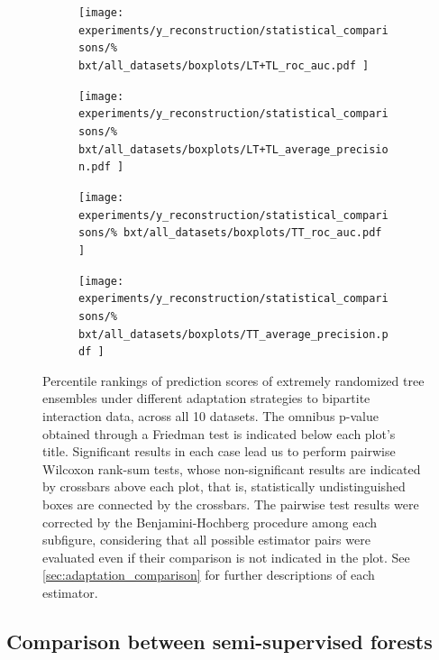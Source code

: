 \begin{figure}[tbh]
    \centering
    \begin{subfigure}{0.49\textwidth}
        \texttt{[image: 
            experiments/y\_reconstruction/statistical\_comparisons/\%
            bxt/all\_datasets/boxplots/LT+TL\_roc\_auc.pdf
        ]}
    \end{subfigure}
    \begin{subfigure}{0.49\textwidth}
        \texttt{[image: 
            experiments/y\_reconstruction/statistical\_comparisons/\%
            bxt/all\_datasets/boxplots/LT+TL\_average\_precision.pdf
        ]}
    \end{subfigure}

    \begin{subfigure}{0.49\textwidth}
        \texttt{[image: 
            experiments/y\_reconstruction/statistical\_comparisons/\%
            bxt/all\_datasets/boxplots/TT\_roc\_auc.pdf
        ]}
    \end{subfigure}
    \begin{subfigure}{0.49\textwidth}
        \texttt{[image: 
            experiments/y\_reconstruction/statistical\_comparisons/\%
            bxt/all\_datasets/boxplots/TT\_average\_precision.pdf
        ]}
    \end{subfigure}
    \caption{
        Percentile rankings of prediction scores of extremely randomized tree ensembles under different adaptation strategies to bipartite interaction data, across all 10 datasets.
        The omnibus p-value obtained through a Friedman test is indicated below each plot's title. Significant results in each case lead us to perform pairwise Wilcoxon rank-sum tests, whose non-significant results are indicated by crossbars above each plot, that is, statistically undistinguished boxes are connected by the crossbars. The pairwise test results were corrected by the Benjamini-Hochberg procedure among each subfigure, considering that all possible estimator pairs were evaluated even if their comparison is not indicated in the plot. See \autoref{sec:adaptation_comparison} for further descriptions of each estimator.
    }
    \label{fig:bxt_y_reconstruction}
\end{figure}



\subsection{Comparison between semi-supervised forests}
\label{sec:ss_comparison}

